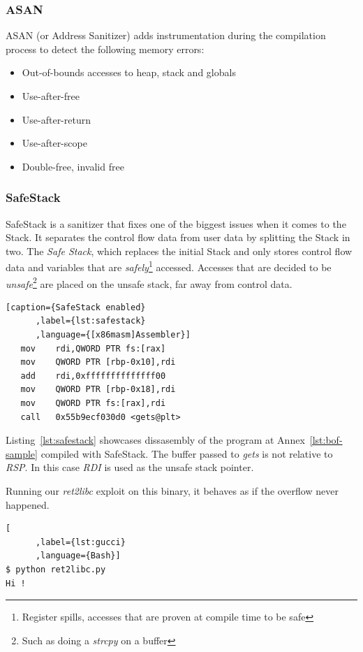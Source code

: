 \documentclass{article}
\begin{document}
\subsubsection{ASAN}
ASAN (or Address Sanitizer) adds instrumentation during the compilation process to detect the following memory errors:

\begin{itemize}
  \item Out-of-bounds accesses to heap, stack and globals
  \item Use-after-free
  \item Use-after-return
  \item Use-after-scope
  \item Double-free, invalid free
\end{itemize}

\subsubsection{SafeStack}
SafeStack is a sanitizer that fixes one of the biggest issues when it comes to the Stack. It separates the control flow data from user data by splitting the Stack in two. The \emph{Safe Stack}, which replaces the initial Stack and only stores control flow data and variables that are \emph{safely}\footnote{Register spills, accesses that are proven at compile time to be safe} accessed. Accesses that are decided to be \emph{unsafe}\footnote{Such as doing a \emph{strcpy} on a buffer} are placed on the unsafe stack, far away from control data.

\begin{lstlisting}[caption={SafeStack enabled}
      ,label={lst:safestack}
      ,language={[x86masm]Assembler}]
   mov    rdi,QWORD PTR fs:[rax]
   mov    QWORD PTR [rbp-0x10],rdi
   add    rdi,0xffffffffffffff00
   mov    QWORD PTR [rbp-0x18],rdi
   mov    QWORD PTR fs:[rax],rdi
   call   0x55b9ecf030d0 <gets@plt>
\end{lstlisting}

Listing~\ref{lst:safestack} showcases dissasembly of the program at Annex~\ref{lst:bof-sample} compiled with SafeStack. The buffer passed to \emph{gets} is not relative to \emph{RSP}. In this case \emph{RDI} is used as the unsafe stack pointer.

Running our \emph{ret2libc} exploit on this binary, it behaves as if the overflow never happened. 
\begin{lstlisting}[
      ,label={lst:gucci}
      ,language={Bash}]
$ python ret2libc.py
Hi !
\end{lstlisting}
\end{document}
